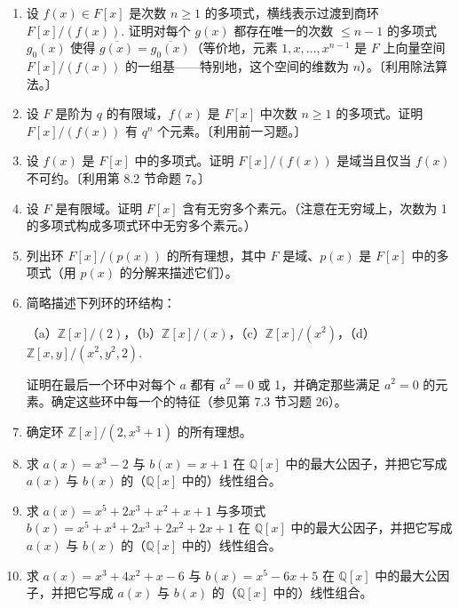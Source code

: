 \begin{enumerate}
\item 设 \(f(x) \in F[x]\) 是次数 \(n \geq 1\) 的多项式，横线表示过渡到商环 \(F[x]/(f(x))\). 证明对每个 \(g(x)\) 都存在唯一的次数 \(\leq n-1\) 的多项式 \(g_0(x)\) 使得 \(\overline{g(x)} = \overline{g_0(x)}\)（等价地，元素 \(1, x, \ldots, x^{n-1}\) 是 \(F\) 上向量空间 \(F[x]/(f(x))\) 的一组基——特别地，这个空间的维数为 \(n\)）。〔利用除法算法。〕

\item 设 \(F\) 是阶为 \(q\) 的有限域，\(f(x)\) 是 \(F[x]\) 中次数 \(n \geq 1\) 的多项式。证明 \(F[x]/(f(x))\) 有 \(q^n\) 个元素。〔利用前一习题。〕

\item 设 \(f(x)\) 是 \(F[x]\) 中的多项式。证明 \(F[x]/(f(x))\) 是域当且仅当 \(f(x)\) 不可约。〔利用第 8.2 节命题 7。〕

\item 设 \(F\) 是有限域。证明 \(F[x]\) 含有无穷多个素元。（注意在无穷域上，次数为 1 的多项式构成多项式环中无穷多个素元。）

\item 列出环 \(F[x]/(p(x))\) 的所有理想，其中 \(F\) 是域、\(p(x)\) 是 \(F[x]\) 中的多项式（用 \(p(x)\) 的分解来描述它们）。

\item 简略描述下列环的环结构：

（a）\(\mathbb{Z}[x]/(2)\)，（b）\(\mathbb{Z}[x]/(x)\)，（c）\(\mathbb{Z}[x]/(x^2)\)，（d）\(\mathbb{Z}[x, y]/(x^2, y^2, 2)\).

证明在最后一个环中对每个 \(a\) 都有 \(a^2 = 0\) 或 1，并确定那些满足 \(a^2 = 0\) 的元素。确定这些环中每一个的特征（参见第 7.3 节习题 26）。

\item 确定环 \(\mathbb{Z}[x]/(2, x^3+1)\) 的所有理想。

\item 求 \(a(x) = x^3-2\) 与 \(b(x) = x+1\) 在 \(\mathbb{Q}[x]\) 中的最大公因子，并把它写成 \(a(x)\) 与 \(b(x)\) 的（\(\mathbb{Q}[x]\) 中的）线性组合。

\item 求 \(a(x) = x^5+2x^3+x^2+x+1\) 与多项式 \(b(x) = x^5+x^4+2x^3+2x^2+2x+1\) 在 \(\mathbb{Q}[x]\) 中的最大公因子，并把它写成 \(a(x)\) 与 \(b(x)\) 的（\(\mathbb{Q}[x]\) 中的）线性组合。

\item 求 \(a(x) = x^3+4x^2+x-6\) 与 \(b(x) = x^5-6x+5\) 在 \(\mathbb{Q}[x]\) 中的最大公因子，并把它写成 \(a(x)\) 与 \(b(x)\) 的（\(\mathbb{Q}[x]\) 中的）线性组合。


\end{enumerate}
